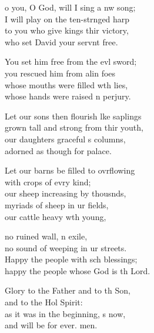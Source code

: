 \settowidth{\versewidth}{Let our sons then flourish like saplings *}
\begin{psalmverse}%
  \begin{patverse}
o you, O God, will I sing a nw song;\Med\\
I will play on the ten-str\pointup{\i}nged harp\\
to you who give kings thir victory,\Med\\
who set David your servnt free.

You set him free from the ev\pointup{\i}l sword;\Med\\
you rescued him from alin foes\\
whose mouths were filled w\pointup{\i}th lies,\Med\\
whose hands were raised \pointup{\i}n perjury.

Let our sons then flourish l\pointup{\i}ke saplings\Med\\
grown tall and strong from thir youth,\\
our daughters graceful s columns,\Med\\
adorned as though for  palace.

Let our barns be filled to ovrflowing\Med\\
with crops of evry kind;\\
our sheep increasing by thousnds,\Flex\\
myriads of sheep in ur fields,\Med\\
our cattle heavy w\pointup{\i}th young,

no ruined wall, n exile,\Med\\
no sound of weeping in ur streets.\\
Happy the people with sch blessings;\Med\\
happy the people whose God is th Lord.

Glory to the Father and to th Son,\Med\\
and to the Hol Spirit:\\
as it was in the beginning, \pointup{\i}s now,\Med\\
and will be for ever. men.
  \end{patverse}
\end{psalmverse}

